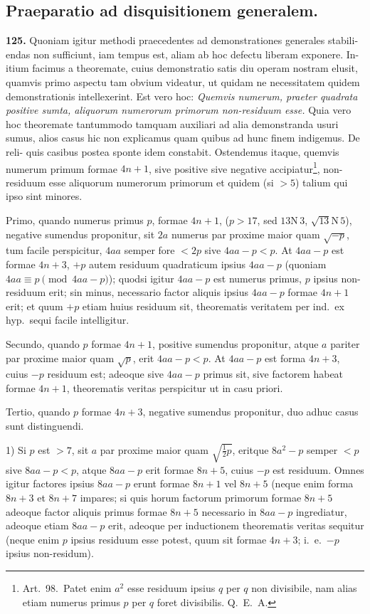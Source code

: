 \documentclass[12pt,a4paper]{article}
\newcommand{\N}{\mbox{N}}
\begin{document}
\subsection*{Praeparatio ad disquisitionem generalem.}

\textbf{125.}
Quoniam igitur methodi praecedentes ad demonstrationes generales stabili-
endas non sufficiunt, iam tempus est, aliam ab hoc defectu liberam exponere. In-
itium facimus a theoremate, cuius demonstratio satis diu operam nostram elusit,
quamvis primo aspectu tam obvium videatur, ut quidam ne necessitatem quidem
demonstrationis intellexerint. Est vero hoc: \textit{Quemvis numerum, praeter quadrata
positive sumta, aliquorum numerorum primorum non-residuum esse.} Quia vero hoc
theoremate tantummodo tamquam auxiliari ad alia demonstranda usuri sumus,
alios casus hic non explicamus quam quibus ad hunc finem indigemus. De reli-
quis casibus postea sponte idem constabit. Ostendemus itaque, quemvis numerum
primum formae $4n+1$, sive positive sive negative accipiatur\footnote{Art.~98.\ Patet enim $a^2$ esse residuum ipsius $q$ per $q$ non divisibile, nam alias etiam numerus primus $p$ per $q$ foret divisibilis. Q.~E.~A.}, non-residuum esse
aliquorum numerorum primorum et quidem (si $> 5$) talium qui ipso sint minores.

Primo, quando numerus primus $p$, formae $4n+1$, ($p > 17$, sed $13 \N\, 3$,
$\sqrt{13} \N\, 5$), negative sumendus proponitur, sit $2a$ numerus par proxime maior
quam $\sqrt{-p}$, tum facile perspicitur, $4aa$ semper fore $< 2p$ sive $4aa - p < p$.
At $4aa - p$ est formae $4n+3$, $+p$ autem residuum quadraticum ipsius $4aa - p$
(quoniam $4aa \equiv p \pmod{4aa-p}$); quodsi igitur $4aa - p$ est numerus primus,
$p$ ipsius non-residuum erit; sin minus, necessario factor aliquis ipsius $4aa - p$
formae $4n+1$ erit; et quum $+p$ etiam huius residuum sit, theorematis veritatem
per ind.\ ex hyp.\ sequi facile intelligitur.

Secundo, quando $p$ formae $4n+1$, positive sumendus proponitur, atque
$a$ pariter par proxime maior quam $\sqrt{p}$, erit $4aa - p < p$. At $4aa - p$ est
forma $4n+3$, cuius $-p$ residuum est; adeoque sive $4aa - p$ primus sit, sive
factorem habeat formae $4n+1$, theorematis veritas perspicitur ut in casu priori.

Tertio, quando $p$ formae $4n+3$, negative sumendus proponitur, duo adhuc
casus sunt distinguendi.

1) Si $p$ est $> 7$, sit $a$ par proxime maior quam $\sqrt{\frac{1}{2}p}$, eritque $8a^2 - p$ semper
$< p$ sive $8aa - p < p$, atque $8aa - p$ erit formae $8n+5$, cuius $-p$ est residuum.
Omnes igitur factores ipsius $8aa - p$ erunt formae $8n+1$ vel $8n+5$ (neque enim
forma $8n+3$ et $8n+7$ impares; si quis horum factorum primorum formae $8n+5$
adeoque factor aliquis primus formae $8n+5$ necessario in $8aa - p$ ingrediatur,
adeoque etiam $8aa - p$ erit, adeoque per inductionem theorematis veritas sequitur
(neque enim $p$ ipsius residuum esse potest, quum sit formae $4n+3$; i.~e.\ $-p$
ipsius non-residum).
\end{document}
